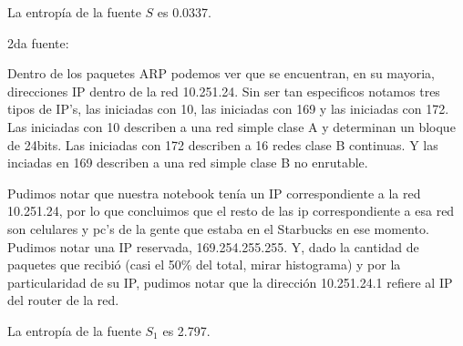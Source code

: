 La entropía de la fuente $S$ es 0.0337.\newline

2da fuente:\newline

Dentro de los paquetes ARP podemos ver que se encuentran, en su mayoria, direcciones IP dentro de la red 10.251.24. Sin ser tan especificos notamos tres tipos de IP's, las iniciadas con 10, las iniciadas con 169 y las iniciadas con 172. Las iniciadas con 10 describen a una red simple clase A y determinan un bloque de 24bits. Las iniciadas con 172 describen a 16 redes clase B continuas. Y las inciadas en 169 describen a una red simple clase B no enrutable.\newline

Pudimos notar que nuestra notebook tenía un IP correspondiente a la red 10.251.24, por lo que concluimos que el resto de las ip correspondiente a esa red son celulares y pc's de la gente que estaba en el Starbucks en ese momento. Pudimos notar una IP reservada, 169.254.255.255. Y, dado la cantidad de paquetes que recibió (casi el 50\% del total, mirar histograma) y por la particularidad de su IP, pudimos notar que la dirección 10.251.24.1 refiere al IP del router de la red.\newline

La entropía de la fuente $S_1$ es 2.797.\newline








